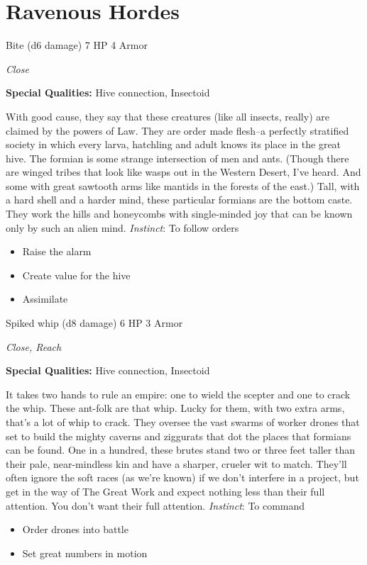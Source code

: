 \section{Ravenous Hordes}

\HRule
{}

Bite (d6 damage)\hspace*{\fill} 7 HP 4 Armor

\emph{Close}

\textbf{Special Qualities:}
Hive connection, Insectoid

\HRule
With good cause, they say that these creatures (like all insects, really) are claimed by the powers of Law. They are order made flesh--a perfectly stratified society in which every larva, hatchling and adult knows its place in the great hive. The formian is some strange intersection of men and ants. (Though there are winged tribes that look like wasps out in the Western Desert, I've heard. And some with great sawtooth arms like mantids in the forests of the east.) Tall, with a hard shell and a harder mind, these particular formians are the bottom caste. They work the hills and honeycombs with single-minded joy that can be known only by such an alien mind. \emph{Instinct}: To follow orders
\begin{itemize}
\item Raise the alarm
\item Create value for the hive
\item Assimilate
\end{itemize}
\newpage
\HRule
{}

Spiked whip (d8 damage)\hspace*{\fill} 6 HP 3 Armor

\emph{Close, Reach}

\textbf{Special Qualities:}
Hive connection, Insectoid

\HRule
It takes two hands to rule an empire: one to wield the scepter and one to crack the whip. These ant-folk are that whip. Lucky for them, with two extra arms, that's a lot of whip to crack. They oversee the vast swarms of worker drones that set to build the mighty caverns and ziggurats that dot the places that formians can be found. One in a hundred, these brutes stand two or three feet taller than their pale, near-mindless kin and have a sharper, crueler wit to match. They'll often ignore the soft races (as we're known) if we don't interfere in a project, but get in the way of The Great Work and expect nothing less than their full attention. You don't want their full attention. \emph{Instinct}: To command
\begin{itemize}
\item Order drones into battle
\item Set great numbers in motion
\end{itemize}
\newpage
\HRule
{}

